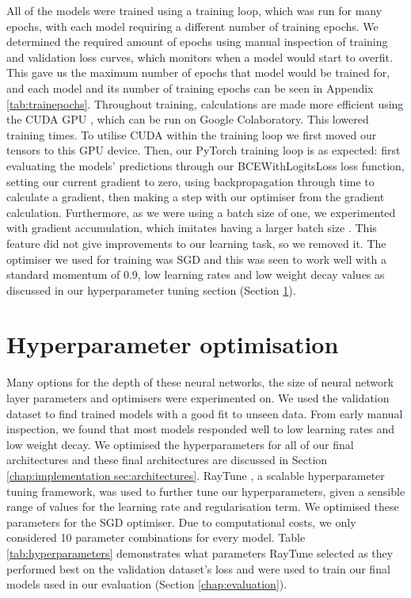 \documentclass{l4proj}
\begin{document}
All of the models were trained using a training loop, which was run for many epochs, with each model requiring a different number of training epochs. We determined the required amount of epochs using manual inspection of training and validation loss curves, which monitors when a model would start to overfit. This gave us the maximum number of epochs that model would be trained for, and each model and its number of training epochs can be seen in Appendix \ref{tab:trainepochs}. Throughout training, calculations are made more efficient using the CUDA GPU \citep{Nickolls:08}, which can be run on Google Colaboratory. This lowered training times. To utilise CUDA within the training loop we first moved our tensors to this GPU device. Then, our PyTorch training loop is as expected: first evaluating the models' predictions through our BCEWithLogitsLoss loss function, setting our current gradient to zero, using backpropagation through time to calculate a gradient, then making a step with our optimiser from the gradient calculation. Furthermore, as we were using a batch size of one, we experimented with gradient accumulation, which imitates having a larger batch size \citep{Bhattacharyya:20}. This feature did not give improvements to our learning task, so we removed it. The optimiser we used for training was SGD and this was seen to work well with a standard momentum of 0.9, low learning rates and low weight decay values as discussed in our hyperparameter tuning section (Section \ref{chap:implementation section:hyperparameters}).

\section{Hyperparameter optimisation}
\label{chap:implementation section:hyperparameters}
Many options for the depth of these neural networks, the size of neural network layer parameters and optimisers were experimented on. We used the validation dataset to find trained models with a good fit to unseen data. From early manual inspection, we found that most models responded well to low learning rates and low weight decay. We optimised the hyperparameters for all of our final architectures and these final architectures are discussed in Section \ref{chap:implementation sec:architectures}. RayTune \citep{Liaw:18}, a scalable hyperparameter tuning framework, was used to further tune our hyperparameters, given a sensible range of values for the learning rate and regularisation term. We optimised these parameters for the SGD optimiser. Due to computational costs, we only considered 10 parameter combinations for every model. Table \ref{tab:hyperparameters} demonstrates what parameters RayTune selected as they performed best on the validation dataset's loss and were used to train our final models used in our evaluation (Section \ref{chap:evaluation}).
\end{document}
